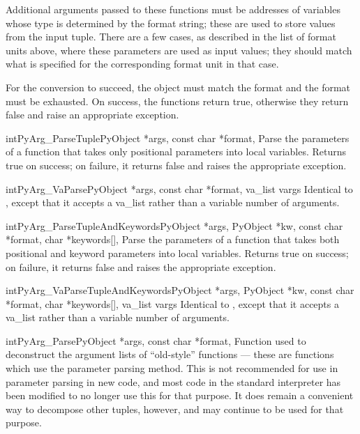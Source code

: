 Additional arguments passed to these functions must be addresses of
variables whose type is determined by the format string; these are
used to store values from the input tuple.  There are a few cases, as
described in the list of format units above, where these parameters
are used as input values; they should match what is specified for the
corresponding format unit in that case.

For the conversion to succeed, the  object must match the
format and the format must be exhausted.  On success, the
 functions return true, otherwise they
return false and raise an appropriate exception.

\begin{cfuncdesc}{int}{PyArg_ParseTuple}{PyObject *args, const char *format,
                                         \moreargs}
  Parse the parameters of a function that takes only positional
  parameters into local variables.  Returns true on success; on
  failure, it returns false and raises the appropriate exception.
\end{cfuncdesc}

\begin{cfuncdesc}{int}{PyArg_VaParse}{PyObject *args, const char *format,
                                         va_list vargs}
  Identical to , except that it accepts a
  va_list rather than a variable number of arguments.
\end{cfuncdesc}

\begin{cfuncdesc}{int}{PyArg_ParseTupleAndKeywords}{PyObject *args,
                       PyObject *kw, const char *format, char *keywords[],
                       \moreargs}
  Parse the parameters of a function that takes both positional and
  keyword parameters into local variables.  Returns true on success;
  on failure, it returns false and raises the appropriate exception.
\end{cfuncdesc}

\begin{cfuncdesc}{int}{PyArg_VaParseTupleAndKeywords}{PyObject *args,
                       PyObject *kw, const char *format, char *keywords[],
                       va_list vargs}
  Identical to , except that it
  accepts a va_list rather than a variable number of arguments.
\end{cfuncdesc}

\begin{cfuncdesc}{int}{PyArg_Parse}{PyObject *args, const char *format,
                                    \moreargs}
  Function used to deconstruct the argument lists of ``old-style''
  functions --- these are functions which use the
   parameter parsing method.  This is not
  recommended for use in parameter parsing in new code, and most code
  in the standard interpreter has been modified to no longer use this
  for that purpose.  It does remain a convenient way to decompose
  other tuples, however, and may continue to be used for that
  purpose.
\end{cfuncdesc}

